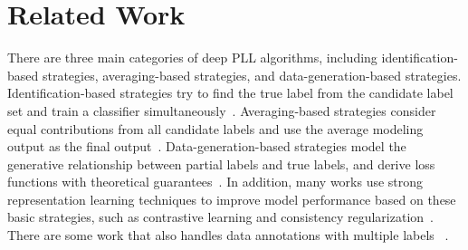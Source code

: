 \section{Related Work}
There are three main categories of deep PLL algorithms, including identification-based strategies, averaging-based strategies, and data-generation-based strategies. Identification-based strategies try to find the true label from the candidate label set and train a classifier simultaneously~\citep{yao2020deep,lv2020progressive,wang2020semi,zhang20222exploiting,wang2022partial,li2023learning,xu2023progressive,gong2022partial,he2024candidate,tian2024crosel,lv2024what}. Averaging-based strategies consider equal contributions from all candidate labels and use the average modeling output as the final output~\citep{lv2024on}. Data-generation-based strategies model the generative relationship between partial labels and true labels, and derive loss functions with theoretical guarantees~\citep{feng2020provably,feng2020learning,wen2021leveraged,qiao2023decompositional}. In addition, many works use strong representation learning techniques to improve model performance based on these basic strategies, such as contrastive learning and consistency regularization~\citep{wang2022pico,wu2022revisiting,xia2022ambiguity,wu2024distilling}. There are some work that also handles data annotations with multiple labels~\citep{khetan2018learning,peterson2019human,collins2022eliciting,schmarje2022is,gao2022learning,goswami2023aqua} .